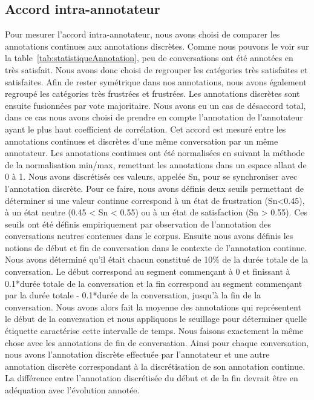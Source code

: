 \subsection{Accord intra-annotateur}
Pour mesurer l'accord intra-annotateur, nous avons choisi de comparer les annotations continues aux annotations discrètes. Comme nous pouvons le voir sur la table~\ref{tab:statistiqueAnnotation}, peu de conversations ont été annotées en très satisfait. Nous avons donc choisi de regrouper les catégories très satisfaites et satisfaites. Afin de rester symétrique dans nos annotations, nous avons également regroupé les catégories très frustrées et frustrées. Les annotations discrètes sont ensuite fusionnées par vote majoritaire. Nous avons eu un cas de désaccord total, dans ce cas nous avons choisi de prendre en compte l'annotation de l'annotateur ayant le plus haut coefficient de corrélation.
Cet accord est mesuré entre les annotations continues et discrètes d'une même conversation par un même annotateur. Les annotations continues ont été normalisées en suivant la méthode de la normalisation min/max, remettant les annotations dans un espace allant de 0 à 1.
Nous avons discrétisés ces valeurs, appelée Sn, pour se synchroniser avec l'annotation discrète. Pour ce faire, nous avons définis deux seuils permettant de déterminer si une valeur continue correspond à un état de frustration (Sn<0.45), à un état neutre (0.45 < Sn < 0.55) ou à un état de satisfaction (Sn > 0.55). Ces seuils ont été définis empiriquement par observation de l'annotation des conversations neutres contenues dans le corpus.
Ensuite nous avons définis les notions de début et fin de conversation dans le contexte de l'annotation continue. Nous avons déterminé qu'il était chacun constitué de 10\% de la durée totale de la conversation. Le début correspond au segment commençant à 0 et finissant à 0.1*durée totale de la conversation et la fin correspond au segment commençant par la durée totale - 0.1*durée de la conversation, jusqu'à la fin de la conversation.
Nous avons alors fait la moyenne des annotations qui représentent le début de la conversation et nous appliquons le seuillage pour déterminer quelle étiquette caractérise cette intervalle de temps. Nous faisons exactement la même chose avec les annotations de fin de conversation. Ainsi pour chaque conversation, nous avons l'annotation discrète effectuée par l'annotateur et une autre annotation discrète correspondant à la discrétisation de son annotation continue.
La différence entre l'annotation discrétisée du début et de la fin devrait être en adéquation avec l'évolution annotée.
